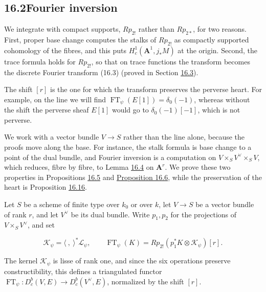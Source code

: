 \documentclass[11pt]{article}
\providecommand{\Dbc}{}\renewcommand{\Dbc}{D^b_c}
\begin{document}
\subsection*{\texorpdfstring{16.2\quad Fourier inversion}{16.2 Fourier inversion}}
\label{bp15}%
\label{bp16}%
We integrate with compact supports, \(Rp_{2!}\) rather than \(Rp_{2*}\), for two reasons. First, proper base change computes the stalks of \(Rp_{2!}\) as compactly supported cohomology of the fibres, and this puts \(H^1_c(\mathbf A^1,j_*M)\) at the origin. Second, the trace formula holds for \(Rp_{2!}\), so that on trace functions the transform becomes the discrete Fourier transform (16.3) (proved in Section \hyperref[bp24]{16.3}).

The shift \([r]\) is the one for which the transform preserves the perverse heart. For example, on the line we will find \(\operatorname{FT}_\psi(E[1])=\delta_0(-1)\), whereas without the shift the perverse sheaf \(E[1]\) would go to \(\delta_0(-1)[-1]\), which is not perverse.

We work with a vector bundle \(V\to S\) rather than the line alone, because the proofs move along the base. For instance, the stalk formula is base change to a point of the dual bundle, and Fourier inversion is a computation on \(V\times_SV^\vee\times_SV\), which reduces, fibre by fibre, to Lemma \hyperref[bp13]{16.4} on \(\mathbf A^r\). We prove these two properties in Propositions \hyperref[bp17]{16.5} and \hyperref[bp19]{Proposition 16.6}, while the preservation of the heart is Proposition \hyperref[bp48]{16.16}.

Let \(S\) be a scheme of finite type over \(k_0\) or over \(k\), let \(V\to S\) be a vector bundle of rank \(r\), and let \(V^\vee\) be its dual bundle. Write \(p_1,p_2\) for the projections of \(V\times_SV^\vee\), and set

\[
\mathcal K_\psi=\langle\ ,\ \rangle^*\mathcal L_\psi,
\qquad
\operatorname{FT}_\psi(K)
=Rp_{2!}(p_1^*K\otimes\mathcal K_\psi)[r].
\tag{16.1}
\]

The kernel \(\mathcal K_\psi\) is lisse of rank one, and since the six operations preserve constructibility, this defines a triangulated functor \(\operatorname{FT}_\psi:\Dbc(V,E)\to\Dbc(V^\vee,E)\), normalized by the shift \([r]\).
\end{document}

